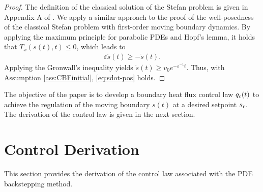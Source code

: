 \documentclass[letterpaper, 10 pt, conference]{cls/ieeeconf}
\theoremstyle{definition}
\newcommand{\ep}{\varepsilon}
\begin{document}
\begin{proof}
    The definition of the classical solution of the Stefan problem is given in 
Appendix A of \cite{Shumon19journal}. We apply a similar approach to the proof of the well-posedness of the classical Stefan problem with first-order moving boundary dynamics. By applying the maximum principle for parabolic PDEs and Hopf's lemma, it holds that $T_{x}(s(t),t) \leq 0$, which leads to 
\begin{align}
    \ep \ddot s(t) \geq - \dot s(t). 
\end{align}
Applying the Gronwall's inequality yields $
    \dot s(t) \geq v_0 e^{ - \ep^{-1} t}$. 
Thus, with Assumption \ref{ass:CBFinitial}, \eqref{eq:sdot-pos} holds. 

\end{proof}

The objective of the paper is to develop a boundary heat flux control law $q_{\rm c}(t)$ to achieve the regulation of the moving boundary $s(t)$ at a desired setpoint $s_{\rm r}$. The derivation of the control law is given in the next section. 


\section{Control Derivation} \label{sec:control}

This section provides the derivation of the control law associated with the PDE backstepping method. 
\end{document}
